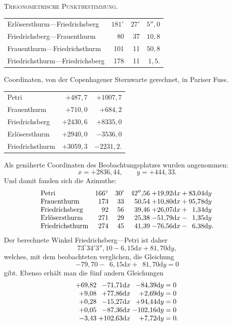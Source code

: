 \clearpage
{}\hfill\textsc{Trigonometrische Punktbestimmung.}\hfill\mbox{}\par\medskip
\begin{center}
\begin{tabular}{lrrr}
Erlösersthurm---Friedrichsberg&$181^\circ$&$27'$&$5''{,}0$\\
Friedrichsberg---Frauenthurm&80&37&$10{,}8$\\
Frauenthurm---Friedrichsthurm&101&11&$50{,}8$\\
Friedrichsthurm---Friedrichsberg&178&11&$1{,}5$.
\end{tabular}
\end{center}
\begin{center}
Coordinaten, von der Copenhagener Sternwarte gerechnet, in Pariser Fuss.
\end{center}
\begin{center}
\begin{tabular}{lrr}
Petri&$+487{,}7$&$+1007{,}7$\\
Frauenthurm&$+710{,}0$&$+684{,}2$\\
Friedrichsberg&$+2430{,}6$&$+8335{,}0$\\
Erlösersthurm&$+2940{,}0$&$-3536{,}0$\\
Friedrichsthurm&$+3059{,}3$&$-2231{,}2$.
\end{tabular}
\end{center}
Als genäherte Coordinaten des Beobachtungsplatzes wurden angenommen:
\[
x=+2836{,}44,\qquad y=+444{,}33.
\]
Und damit fanden sich die Azimuthe:
\[
\begin{array}{lrrr@{\;}l}
\text{Petri}&166^\circ&30'&42''{,}56&+19{,}92\mathrm dx+83{,}04\mathrm dy\\
\text{Frauenthurm}&173&33&50{,}54&+10{,}80\mathrm dx+95{,}78\mathrm dy\\
\text{Friedrichsberg}&92&56&39{,}46&+26{,}07\mathrm dx+\phantom01{,}34\mathrm dy\\
\text{Erlösersthurm}&271&29&25{,}38&-51{,}79\mathrm dx-\phantom01{,}35\mathrm dy\\
\text{Friedrichsthurm}&274&45&41{,}39&-76{,}56\mathrm dx-\phantom06{,}38\mathrm dy.
\end{array}
\]
Der berechnete Winkel Friedrichsberg---Petri ist daher
\[
73^\circ34'3''{,}10-6{,}15\mathrm dx+81{,}70\mathrm dy,
\]
welches, mit dem beobachteten verglichen, die Gleichung
\[
-79{,}70-\phantom06{,}15\mathrm dx+\phantom081{,}70\mathrm dy=0
\]
gibt. Ebenso erhält man die fünf andern Gleichungen
\[
\begin{array}{r@{\;}r@{\;}r@{\;}l}
+69{,}82&-71{,}71\mathrm dx&-84{,}39\mathrm dy&=0\\
+9{,}08&+77{,}86\mathrm dx&+2{,}69\mathrm dy&=0\\
+0{,}28&-15{,}27\mathrm dx&+94{,}44\mathrm dy&=0\\
+0{,}05&-87{,}36\mathrm dx&-102{,}16\mathrm dy&=0\\
-3{,}43&+102{,}63\mathrm dx&+7{,}72\mathrm dy&=0.
\end{array}
\]
